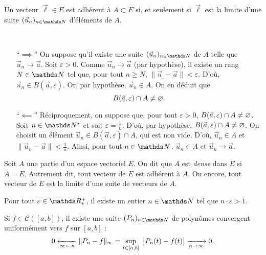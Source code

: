 \begin{prop}
	Un vecteur $\vec{\ell} \in E$\/ est adhérent à $A \subset E$ si, et seulement si $\vec{\ell}$\/ est la limite d'une suite $(\vec{u}_n)_{n\in\N}$\/ d'éléments de $A$.
\end{prop}

\begin{prv}~\\[-\baselineskip]
	\begin{itemize}
		\item[``$\implies$''] On suppose qu'il existe une suite $(\vec{u}_n)_{n\in\N}$\/ de $A$ telle que $\vec{u}_n \to \vec{a}$. Soit $\varepsilon > 0$.
			Comme $\vec{u}_n \to \vec{a}$ (par hypothèse), il existe un rang $N \in \N$\/ tel que, pour tout $n \ge N$, $\|\vec{u}_, - \vec{a}\| < \varepsilon$.
			D'où, $\vec{u}_n \in B(\vec{a}, \varepsilon)$. Or, par hypothèse, $\vec{u}_n \in A$. On en déduit que \[
				B(\vec{a}, \varepsilon) \cap A \neq \varnothing
			.\]
		\item[``$\impliedby$'']
			Réciproquement, on suppose que, pour tout $\varepsilon > 0$, $B(\vec{a}, \varepsilon) \cap A \neq \varnothing$.
			Soit $n \in \N^*$\/ et soit $\varepsilon = \frac{1}{n}$.
			D'où, par hypothèse, $B(\vec{a}, \varepsilon) \cap A \neq \varnothing$.
			On choisit un élément $\vec{u}_n \in B(\vec{a}, \varepsilon) \cap A$, qui est non vide.
			D'où, $\vec{u}_n \in A$\/ et $\|\vec{u}_n - \vec{a}\| < \frac{1}{n}$.
			Ainsi, pour tout $n \in \N$, $\vec{u}_n \in A$\/ et $\vec{u}_n \to \vec{a}$.
	\end{itemize}
\end{prv}

\begin{defn}
	Soit $A$\/ une partie d'un espace vectoriel $E$. On dit que $A$\/ est \textit{dense} dans $E$\/ si $\bar{A} = E$. Autrement dit, tout vecteur de $E$\/ est adhérent à $A$. Ou encore, tout vecteur de $E$\/ est la limite d'une suite de vecteurs de $A$.
\end{defn}

\begin{rap}
	Pour tout $\varepsilon \in \R^+_*$, il existe un entier $n \in \N$\/ tel que $n \cdot \varepsilon > 1$.
\end{rap}

\begin{rap}
	Si $f \in \mathcal{C}([a,b])$, il existe une suite $(P_n)_{n\in\N}$\/ de polynômes convergent uniformément vers $f$\/ sur $[a,b]$\/ :  \[
		0 \xleftarrow[\infty \gets n]{} \|P_n-f\|_\infty = \sup_{t \in [a,b]}\ \big|P_n(t) - f(t)\big| \xrightarrow[n\to \infty]{} 0
	.\]
\end{rap}


